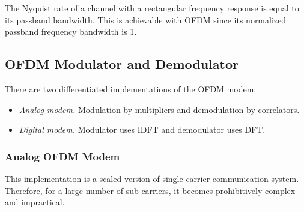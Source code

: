 The Nyquist rate of a channel with a rectangular frequency response is equal to its passband bandwidth. This is achievable with OFDM since its normalized passband frequency bandwidth is 1\cite{fuqin}.


\subsection{OFDM Modulator and Demodulator}
There are two differentiated implementations of the OFDM modem:
\begin{itemize}
	\item \emph{Analog modem.} Modulation by multipliers and demodulation by correlators.
	\item \emph{Digital modem.} Modulator uses \gls{IDFT} and demodulator uses \gls{DFT}.
\end{itemize}

\subsubsection{Analog OFDM Modem}
This implementation is a scaled version of single carrier communication system. Therefore, for a large number of sub-carriers, it becomes prohibitively complex and impractical. 

